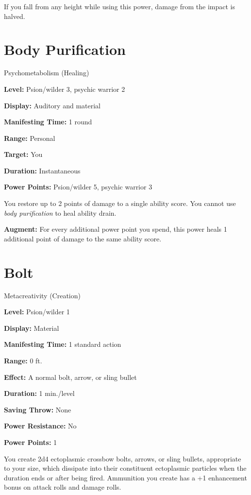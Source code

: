 \documentclass{article}
\begin{document}
If you fall from any height while using this power, damage from the impact is halved.

\vspace{12pt}
\section*{Body Purification}

Psychometabolism (Healing)

\textbf{Level:} Psion/wilder 3, psychic warrior 2

\textbf{Display:} Auditory and material

\textbf{Manifesting Time:} 1 round

\textbf{Range:} Personal

\textbf{Target:} You

\textbf{Duration:} Instantaneous

\textbf{Power Points:} Psion/wilder 5, psychic warrior 3

You restore up to 2 points of damage to a single ability score. You cannot use 
\textit{body purification }to heal ability drain.

\textbf{Augment:} For every additional power point you spend, this power heals 
1 additional point of damage to the same ability score.

\vspace{12pt}
\section*{Bolt}

Metacreativity (Creation)

\textbf{Level:} Psion/wilder 1

\textbf{Display:} Material

\textbf{Manifesting Time:} 1 standard action

\textbf{Range:} 0 ft.

\textbf{Effect:} A normal bolt, arrow, or sling bullet

\textbf{Duration:} 1 min./level

\textbf{Saving Throw:} None

\textbf{Power Resistance:} No

\textbf{Power Points:} 1

You create 2d4 ectoplasmic crossbow bolts, arrows, or sling bullets, appropriate 
to your size, which dissipate into their constituent ectoplasmic particles when 
the duration ends or after being fired. Ammunition you create has a +1 enhancement 
bonus on attack rolls and damage rolls.
\end{document}
